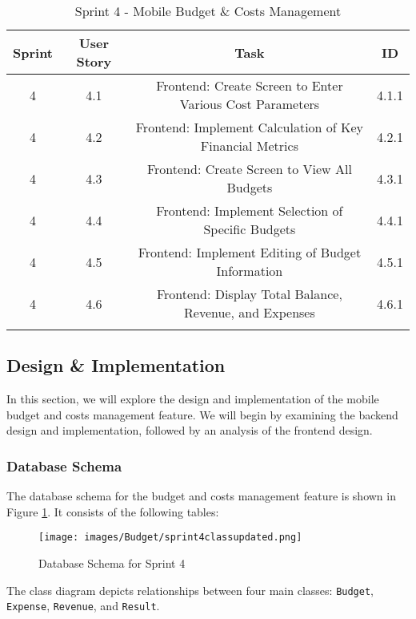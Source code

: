 \setlength{\LTleft}{0pt}
\begin{longtable}{|c|c|c|c|}
\hline
\textbf{Sprint} & \textbf{User Story} & \textbf{Task} & \textbf{ID} \\
\hline
4 & 4.1 & Frontend: Create Screen to Enter Various Cost Parameters & 4.1.1 \\
\hline
4 & 4.2 & Frontend: Implement Calculation of Key Financial Metrics & 4.2.1 \\
\hline
4 & 4.3 & Frontend: Create Screen to View All Budgets & 4.3.1 \\
\hline
4 & 4.4 & Frontend: Implement Selection of Specific Budgets & 4.4.1 \\
\hline
4 & 4.5 & Frontend: Implement Editing of Budget Information & 4.5.1 \\
\hline
4 & 4.6 & Frontend: Display Total Balance, Revenue, and Expenses & 4.6.1 \\
\hline
\caption{Sprint 4 - Mobile Budget \& Costs Management}
\label{tab:sprint4_backlog}
\end{longtable}

\subsection{Design \& Implementation}

In this section, we will explore the design and implementation of the mobile budget and costs management feature. We will begin by examining the backend design and implementation, followed by an analysis of the frontend design.

\subsubsection{Database Schema}

The database schema for the budget and costs management feature is shown in Figure \ref{fig:db_schema_sprint4}. It consists of the following tables:

\begin{figure}[H]
    \centering
    \texttt{[image: images/Budget/sprint4classupdated.png]}
    \caption{Database Schema for Sprint 4}
    \label{fig:db_schema_sprint4}
\end{figure}

The class diagram depicts relationships between four main classes: \texttt{Budget}, \texttt{Expense}, \texttt{Revenue}, and \texttt{Result}.

